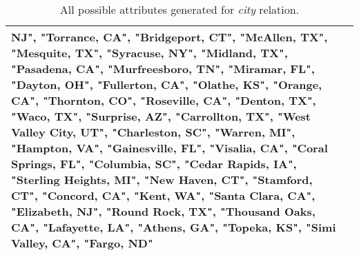 \begin{table*}
{\begin{tabular}{lp{21cm}}
NJ", "Torrance, CA", "Bridgeport, CT", "McAllen, TX", "Mesquite, TX", "Syracuse, NY", "Midland, TX", "Pasadena, CA", "Murfreesboro, TN", "Miramar, FL", "Dayton, OH", "Fullerton, CA", "Olathe, KS", "Orange, CA", "Thornton, CO", "Roseville, CA", "Denton, TX", "Waco, TX", "Surprise, AZ", "Carrollton, TX", "West Valley City, UT", "Charleston, SC", "Warren, MI", "Hampton, VA", "Gainesville, FL", "Visalia, CA", "Coral Springs, FL", "Columbia, SC", "Cedar Rapids, IA", "Sterling Heights, MI", "New Haven, CT", "Stamford, CT", "Concord, CA", "Kent, WA", "Santa Clara, CA", "Elizabeth, NJ", "Round Rock, TX", "Thousand Oaks, CA", "Lafayette, LA", "Athens, GA", "Topeka, KS", "Simi Valley, CA", "Fargo, ND"
            \\ \hline
        \end{tabular}
    }
    \caption{All possible attributes generated for \textit{city} relation.}
    \label{tab:city}
\end{table*}